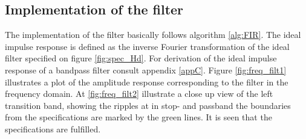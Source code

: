 \subsection{Implementation of the filter}
The implementation of the filter basically follows algorithm \ref{alg:FIR}. The ideal impulse response is defined as the inverse Fourier transformation of the ideal filter specified on figure \ref{fig:spec_Hd}. For derivation of the ideal impulse response of a bandpass filter consult appendix \ref{appC}. Figure \ref{fig:freq_filt1} illustrates a plot of the amplitude response corresponding to the filter in the frequency domain. At \ref{fig:freq_filt2} illustrate a close up view of the left transition band, showing the ripples at in stop- and passband  the boundaries from the specifications are marked by the green lines. It is seen that the specifications are fulfilled.        

